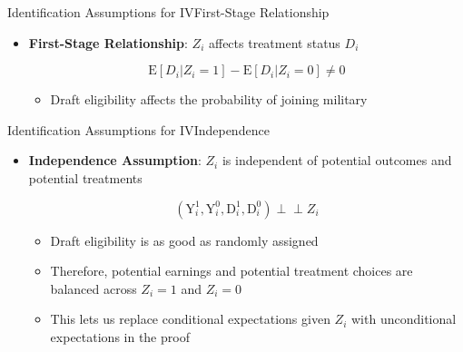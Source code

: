 \documentclass[dvipsnames,hyperref={pdfpagelabels=false}]{beamer}
\newcommand{\indep}{\perp\!\!\!\perp}
\begin{document}
\begin{frame}{Identification Assumptions for IV}{First-Stage Relationship}
	\begin{itemize}
		
		\item \textbf{First-Stage Relationship}: $Z_{i}$ affects treatment status $D_{i}$
		
		\begin{equation*}
			\mathrm{E}[D_{i}|Z_{i}=1]-\mathrm{E}[D_{i}|Z_{i}=0] \neq 0
		\end{equation*}
		
			\begin{itemize}
		\vspace{0.2cm}
		\item Draft eligibility affects the probability of joining military
			\end{itemize}
	
		
	\end{itemize}
\end{frame}




\begin{frame}{Identification Assumptions for IV}{Independence}
	\begin{itemize}
	
		\item \textbf{Independence Assumption}: $Z_{i}$ is independent of potential outcomes and potential treatments
		
		\begin{equation*}
			(\mathrm{Y}^{1}_{i},\mathrm{Y}^{0}_{i}, \mathrm{D}^{1}_{i},\mathrm{D}^{0}_{i})\indep Z_{i}
		\end{equation*}
		\vspace{0.2cm}
				\begin{itemize}
		\item Draft eligibility is as good as randomly assigned
		\vspace{0.2cm}
		\item Therefore, potential earnings and potential treatment choices are balanced across $Z_i=1$ and $Z_i=0$
		\vspace{0.2cm}
		\item This lets us replace conditional expectations given $Z_i$ with unconditional expectations in the proof
				\end{itemize}
	\end{itemize}
\end{frame}
\end{document}
